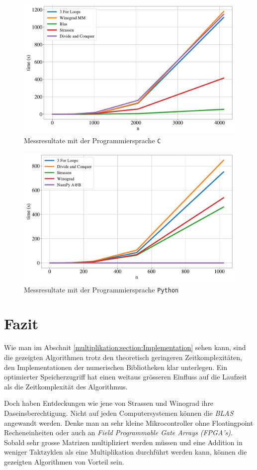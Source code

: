 \begin{figure}
	\center
	\includegraphics[width=\linewidth]{papers/multiplikation/images/c_meas_4096}
	\caption{Messresultate mit der Programmiersprache \texttt{C}}
	\label{multiplikation:fig:c_meas_4096}
\end{figure}


\begin{figure}
	\center
	\includegraphics[width=\linewidth]{papers/multiplikation/images/meas_1024}
	\caption{Messresultate mit der Programmiersprache \texttt{Python}}
	\label{multiplikation:fig:python}
\end{figure}

\section{Fazit}

Wie man im Abschnit \ref{multiplikation:section:Implementation} sehen kann, sind die gezeigten Algorithmen trotz den theoretisch geringeren Zeitkomplexitäten, den Implementationen der numerischen Bibliotheken klar unterlegen.
Ein optimierter Speicherzugriff hat einen weitaus grösseren Einfluss auf die Laufzeit als die Zeitkomplexität des Algorithmus.

Doch haben Entdeckungen wie jene von Strassen und Winograd ihre Daseinsberechtigung.
Nicht auf jeden Computersystemen können die \textit{BLAS} angewandt werden.
Denke man an sehr kleine Mikrocontroller ohne Floatingpoint Recheneinheiten oder auch an \textit{Field Programmable Gate Arrays (FPGA's)}.
Sobald sehr grosse Matrizen multipliziert werden müssen und eine Addition in weniger Taktzyklen als eine Multiplikation durchführt werden kann, können die gezeigten Algorithmen von Vorteil sein.
